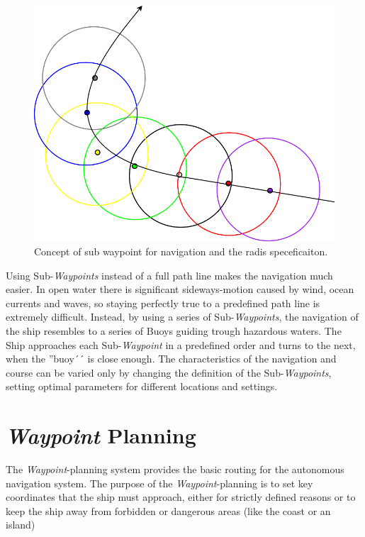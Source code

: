 \begin{figure}[htbp]
\centering
\includegraphics[width = \textwidth]{img/HLIFigures/SWPNavigationConcept.png}
\caption{Concept of sub waypoint for navigation and the radis speceficaiton.}
\label{fig:swp_concept}
\end{figure}

Using Sub-\emph{Waypoints} instead of a full path line makes the navigation much easier. In open water there is significant sideways-motion caused by wind, ocean currents and waves, so staying perfectly true to a predefined path line is extremely difficult.
Instead, by using a series of Sub-\emph{Waypoints}, the navigation of the ship resembles to a series of Buoys guiding trough hazardous waters. The Ship approaches each Sub-\emph{Waypoint} in a predefined order and turns to the next, when the ''buoy´´ is close enough.
The characteristics of the navigation and course can be varied only by changing the definition of the Sub-\emph{Waypoints}, setting optimal parameters for different locations and settings.

\section{\emph{Waypoint} Planning}

The \emph{Waypoint}-planning system provides the basic routing for the autonomous navigation system.
The purpose of the \emph{Waypoint}-planning is to set key coordinates that the ship must approach, either for strictly defined reasons or to keep the ship away from forbidden or dangerous areas (like the coast or an island)

